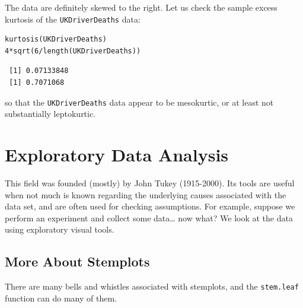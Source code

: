 \documentclass[captions=tableheading]{scrbook}
\begin{document}
The data are definitely skewed to the right. Let us check the sample excess kurtosis of the \texttt{UKDriverDeaths} data:


\begin{verbatim}
kurtosis(UKDriverDeaths)
4*sqrt(6/length(UKDriverDeaths))
\end{verbatim}

\begin{verbatim}
 [1] 0.07133848
 [1] 0.7071068
\end{verbatim}

so that the \texttt{UKDriverDeaths} data appear to be mesokurtic, or at least not substantially leptokurtic.
\section{Exploratory Data Analysis}
\label{sec-3-4}

\label{sec:Exploratory-Data-Analysis}

This field was founded (mostly) by John Tukey (1915-2000). Its tools are useful when not much is known regarding the underlying causes associated with the data set, and are often used for checking assumptions. For example, suppose we perform an experiment and collect some data\ldots{} now what? We look at the data using exploratory visual tools.
\subsection{More About Stemplots}
\label{sec-3-4-1}


There are many bells and whistles associated with stemplots, and the \texttt{stem.leaf} function can do many of them.
\end{document}
